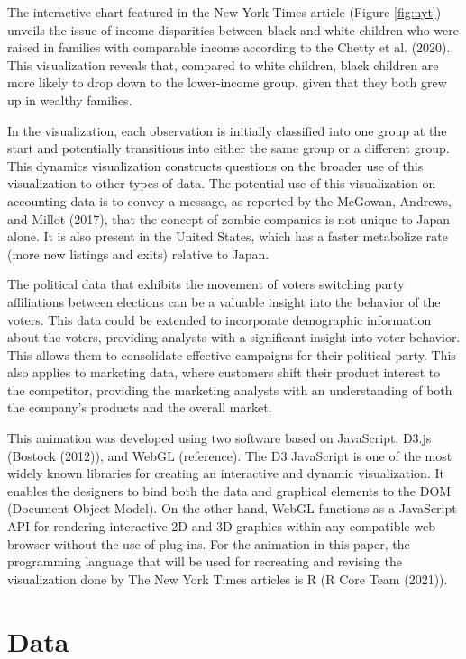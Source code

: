 The interactive chart featured in the New York Times article (Figure \ref{fig:nyt}) unveils the issue of income disparities between black and white children who were raised in families with comparable income according to the Chetty et al. (2020). This visualization reveals that, compared to white children, black children are more likely to drop down to the lower-income group, given that they both grew up in wealthy families.

In the visualization, each observation is initially classified into one group at the start and potentially transitions into either the same group or a different group. This dynamics visualization constructs questions on the broader use of this visualization to other types of data. The potential use of this visualization on accounting data is to convey a message, as reported by the McGowan, Andrews, and Millot (2017), that the concept of zombie companies is not unique to Japan alone. It is also present in the United States, which has a faster metabolize rate (more new listings and exits) relative to Japan.

The political data that exhibits the movement of voters switching party affiliations between elections can be a valuable insight into the behavior of the voters. This data could be extended to incorporate demographic information about the voters, providing analysts with a significant insight into voter behavior. This allows them to consolidate effective campaigns for their political party. This also applies to marketing data, where customers shift their product interest to the competitor, providing the marketing analysts with an understanding of both the company's products and the overall market.

This animation was developed using two software based on JavaScript, D3.js (Bostock (2012)), and WebGL (reference). The D3 JavaScript is one of the most widely known libraries for creating an interactive and dynamic visualization. It enables the designers to bind both the data and graphical elements to the DOM (Document Object Model). On the other hand, WebGL functions as a JavaScript API for rendering interactive 2D and 3D graphics within any compatible web browser without the use of plug-ins. For the animation in this paper, the programming language that will be used for recreating and revising the visualization done by The New York Times articles is R (R Core Team (2021)).

\hypertarget{data}{%
\section{Data}\label{data}}

